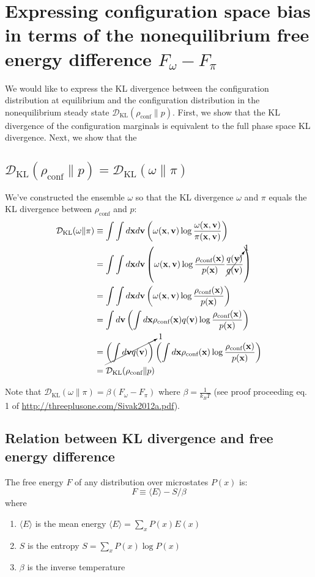 \documentclass[11pt]{article}
\newcommand{\x}{\mathbf{x}}
\newcommand{\vel}{\mathbf{v}}
\newcommand{\kldiv}{\mathcal{D}_\text{KL}}
\newcommand{\conf}{\rho_\text{conf}}
\begin{document}
\section{Expressing configuration space bias in terms of the nonequilibrium free energy difference $F_\omega - F_\pi$}
We would like to express the KL divergence between the configuration distribution at equilibrium and the configuration distribution in the nonequilibrium steady state $\kldiv(\conf \| p)$.
First, we show that the KL divergence of the configuration marginals is equivalent to the full phase space KL divergence.
Next, we show that the 

\subsection{$\kldiv(\conf \| p) = \kldiv( \omega \| \pi)$}
We've constructed the ensemble $\omega$ so that the KL divergence $\omega$ and $\pi$ equals the KL divergence between $\conf$ and $p$:
$$\begin{aligned}
\kldiv(\omega \| \pi) &\equiv \int \int d \x d\vel \left( \omega(\x, \vel) \log \frac{\omega(\x, \vel)}{\pi(\x, \vel)} \right)\\
&= \int \int d \x d\vel \left( \omega(\x, \vel) \log \frac{\conf (\x)}{p(\x)}  \cancelto{1}{\frac{q(\vel)}{q(\vel)}}\right)\\
&= \int \int d \x d\vel \left( \omega(\x, \vel) \log \frac{\conf (\x)}{p(\x)}  \right)\\
&= \int d \vel \left( \int d \x \conf (\x) q(\vel) \log \frac{\conf (\x)}{p(\x)} \right) \\
&= \cancelto{1}{\left( \int d \vel q(\vel) \right)} \left( \int d \x \conf (\x) \log \frac{\conf (\x)}{p(\x)} \right) \\
&= \kldiv(\conf \| p)
\end{aligned}
$$


Note that $\kldiv(\omega \| \pi) = \beta (F_\omega - F_\pi)$ where $\beta = \frac{1}{k_B T}$ (see proof proceeding eq. 1 of \url{http://threeplusone.com/Sivak2012a.pdf}).

\subsection{Relation between KL divergence and  free energy difference}
The free energy $F$ of any distribution over microstates $P(x)$ is:
$$ F \equiv \langle E \rangle - S / \beta$$
where
\begin{enumerate}
\item $\langle E \rangle$ is the mean energy $\langle E \rangle = \sum_x P(x) E(x)$
\item $S$ is the entropy $S = \sum_x P(x) \log P(x)$
\item $\beta$ is the inverse temperature
\end{enumerate}
\end{document}
